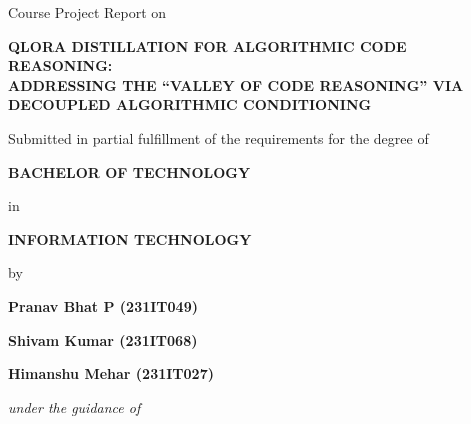 \documentclass[12pt,a4paper]{article}
\begin{document}
\pagestyle{empty}

\begin{center}
    {\large Course Project Report on\par}
    
    \vspace{0.8cm}
    
    {\fontsize{13.5}{17.5}\selectfont \bfseries QLORA DISTILLATION FOR ALGORITHMIC CODE REASONING:\\[0.2cm] ADDRESSING THE ``VALLEY OF CODE REASONING'' VIA\\[0.2cm] DECOUPLED ALGORITHMIC CONDITIONING\par}
    
    \vspace{1.0cm}
    
    {\large Submitted in partial fulfillment of the requirements for the degree of\par}
    
    \vspace{0.4cm}
    
    {\large \bfseries BACHELOR OF TECHNOLOGY\par}
    
    \vspace{0.2cm}
    {\large in\par}
    \vspace{0.2cm}
    
    {\large \bfseries INFORMATION TECHNOLOGY\par}
    
    \vspace{0.8cm}
    
    {\large by\par}
    
    \vspace{0.4cm}
    
    {\large \bfseries Pranav Bhat P (231IT049)\par}
    \vspace{0.15cm}
    {\large \bfseries Shivam Kumar (231IT068)\par}
    \vspace{0.15cm}
    {\large \bfseries Himanshu Mehar (231IT027)\par}
    
    \vspace{0.9cm}
    
    {\large \itshape under the guidance of\par}
    
    \vspace{0.3cm}
    

\end{center}
\end{document}
